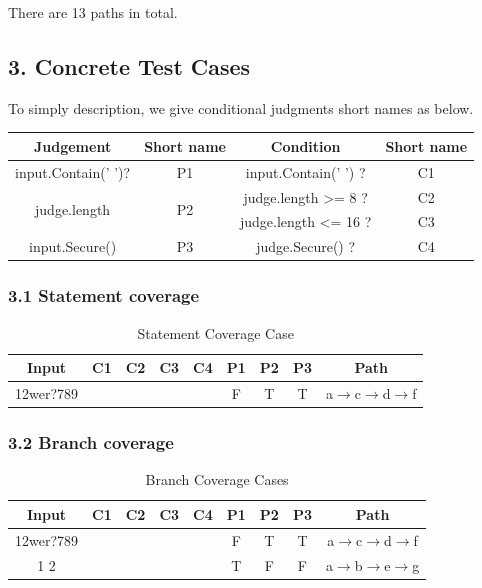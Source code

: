 \documentclass[11pt, oneside]{article}  %
\begin{document}
There are 13 paths in total.

\subsection*{3. Concrete Test Cases}

To simply description, we give conditional judgments short names as below.
\begin{table}[H]
    \begin{tabular}{|c|c|c|c|}
        \hline
        Judgement                     & Short name          & Condition                        & Short name \\ \hline
        input.Contain(' ')?           & P1                  & input.Contain(' ') ?             & C1         \\ \hline
        \multirow{2}{*}{judge.length} & \multirow{2}{*}{P2} & judge.length \textgreater{}= 8 ? & C2         \\ \cline{3-4} 
                                    &                     & judge.length \textless{}= 16 ?   & C3         \\ \hline
        input.Secure()                & P3                  & judge.Secure() ?                 & C4         \\ \hline
    \end{tabular}
\end{table}

\subsubsection*{3.1 Statement coverage}

\begin{table}[H]
    \centering
    \begin{tabular}{|c|c|c|c|c|c|c|c|c|}
    \hline
    Input     & C1 & C2 & C3 & C4 & P1 & P2 & P3 & Path                                              \\ \hline
    12wer?789 &   &   &   &   & F  & T  & T  & a$\rightarrow$c$\rightarrow$d$\rightarrow$f \\ \hline
    \end{tabular}
    \caption{Statement Coverage Case}
\end{table}

\subsubsection*{3.2 Branch coverage}

\begin{table}[H]
    \centering
    \begin{tabular}{|c|c|c|c|c|c|c|c|c|}
        \hline
        Input       & C1 & C2 & C3 & C4 & P1 & P2 & P3 & Path                                              \\ \hline
        12wer?789 &   &   &   &   & F  & T  & T  & a$\rightarrow$c$\rightarrow$d$\rightarrow$f \\ \hline
        1 2       &   &   &   &   & T  & F  & F  & a$\rightarrow$b$\rightarrow$e$\rightarrow$g \\ \hline
    \end{tabular}
    \caption{Branch Coverage Cases}
\end{table}
\end{document}
